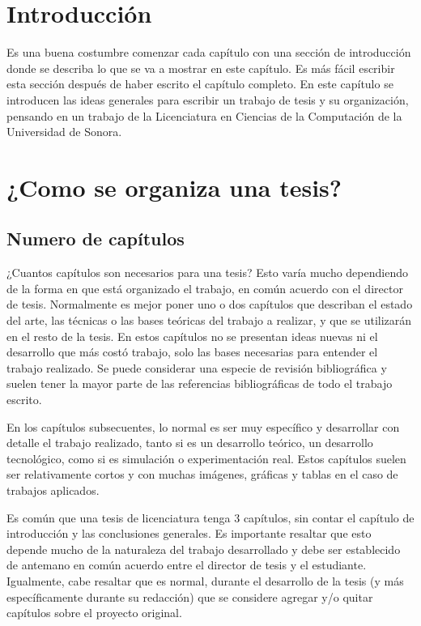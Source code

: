 \section{Introducción}

Es una buena costumbre comenzar cada capítulo con una sección de
introducción donde se describa lo que se va a mostrar en este
capítulo. Es más fácil escribir esta sección después de haber escrito
el capítulo completo. En este capítulo se introducen las ideas
generales para escribir un trabajo de tesis y su organización,
pensando en un trabajo de la Licenciatura en Ciencias de la
Computación de la Universidad de Sonora.

 \section{¿Como se organiza una tesis?}

 \subsection{Numero de capítulos}

 ¿Cuantos capítulos son necesarios para una tesis? Esto varía mucho
 dependiendo de la forma en que está organizado el trabajo, en común
 acuerdo con el director de tesis. Normalmente es mejor poner uno o
 dos capítulos que describan el estado del arte, las técnicas o las
 bases teóricas del trabajo a realizar, y que se utilizarán en el
 resto de la tesis.  En estos capítulos no se presentan ideas nuevas
 ni el desarrollo que más costó trabajo, solo las bases necesarias
 para entender el trabajo realizado. Se puede considerar una especie
 de revisión bibliográfica y suelen tener la mayor parte de las
 referencias bibliográficas de todo el trabajo escrito.

 En los capítulos subsecuentes, lo normal es ser muy específico y
 desarrollar con detalle el trabajo realizado, tanto si es un
 desarrollo teórico, un desarrollo tecnológico, como si es simulación
 o experimentación real. Estos capítulos suelen ser relativamente
 cortos y con muchas imágenes, gráficas y tablas en el caso de
 trabajos aplicados.

 Es común que una tesis de licenciatura tenga 3 capítulos, sin contar
 el capítulo de introducción y las conclusiones generales. Es importante resaltar que esto
 depende mucho de la naturaleza del trabajo desarrollado y debe ser
 establecido de antemano en común acuerdo entre el director de tesis y
 el estudiante. Igualmente, cabe resaltar que es normal, durante el
 desarrollo de la tesis (y más específicamente durante su redacción)
 que se considere agregar y/o quitar capítulos sobre el proyecto
 original.

